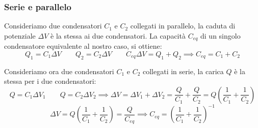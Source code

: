 \documentclass[12pt,a4paper]{article}
\begin{document}
\subsubsection{Serie e parallelo}
Consideriamo due condensatori $C_1$ e $C_2$ collegati in parallelo, la caduta di potenziale $\Delta V$ è la stessa ai due condensatori.
La capacità $C_{eq}$ di un singolo condensatore equivalente al nostro caso, si ottiene:
\begin{equation*}
    Q_1= C_1\Delta V\qquad Q_2 = C_2 \Delta V \qquad C_{eq}\Delta V = Q_1 +Q_2 \implies C_{eq}= C_1 + C_2
\end{equation*}

Consideriamo ora due condensatori $C_1$ e $C_2$ collegati in serie, la carica $Q$ è la stessa per i due condensatori:
\begin{equation*}
    Q = C_1 \Delta V_1\qquad Q= C_2 \Delta V_2 \implies \Delta V = \Delta V_1 + \Delta V_2 = \frac{Q}{C_1} + \frac{Q}{C_2}= 
    Q\left( \frac{1}{C_1}+\frac{1}{C_2} \right)
\end{equation*}
\begin{equation*}
    \Delta V = Q\left( \frac{1}{C_1}+\frac{1}{C_2} \right) = \frac{Q}{C_{eq}} \implies C_{eq} = \left( \frac{1}{C_1}+ \frac{1}{C_2} \right)^{-1}
\end{equation*}
\end{document}
